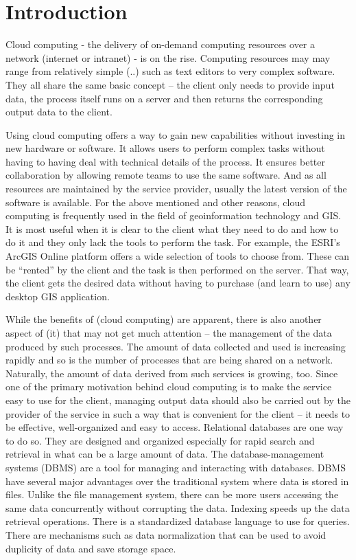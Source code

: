 \chapter{Introduction}
\label{1-introduction}

Cloud computing - the delivery of on-demand computing resources over a network (internet or intranet) -  is on the rise. Computing resources may may range from relatively simple (..) such as text editors to very complex software. They all share the same basic concept – the client only needs to provide input data, the process itself runs on a server and then returns the corresponding output data to the client.

Using cloud computing offers a way to gain new capabilities without investing in new hardware or software. It allows users to perform complex tasks without having to having deal with technical details of the process. It ensures better collaboration by allowing remote teams to use the same software. And as all resources are maintained by the service provider, usually the latest version of the software is available.
For the above mentioned and other reasons, cloud computing is frequently used in the field of geoinformation technology and GIS. It is most useful when it is clear to the client what they need to do and how to do it and they only lack the tools to perform the task. For example, the ESRI’s ArcGIS Online platform offers a wide selection of tools to choose from. These can be “rented” by the client and the task is then performed on the server. That way, the client gets the desired data without having to purchase (and learn to use) any desktop GIS application.

While the benefits of (cloud computing) are apparent, there is also another aspect of (it) that may not get much attention – the management of the data produced by such processes. The amount of data collected and used is increasing rapidly and so is the number of processes that are being shared on a network. Naturally, the amount of data derived from such services is growing, too. Since one of the primary motivation behind cloud computing is to make the service easy to use for the client, managing output data should also be carried out by the provider of the service in such a way that is  convenient for the client – it needs to be effective, well-organized and easy to access.
	Relational databases are one way to do so. They are designed and organized especially for rapid search and retrieval in what can be a large amount of data. The database-management systems (DBMS) are a tool for managing and interacting with databases. DBMS have several major advantages over the traditional system where data is stored in files. Unlike the file management system, there can be more users accessing the same data concurrently without corrupting the data. Indexing speeds up the data retrieval operations. There is a standardized database language to use for queries. There are mechanisms such as data normalization that can be used to avoid duplicity of data and save storage space.
	
